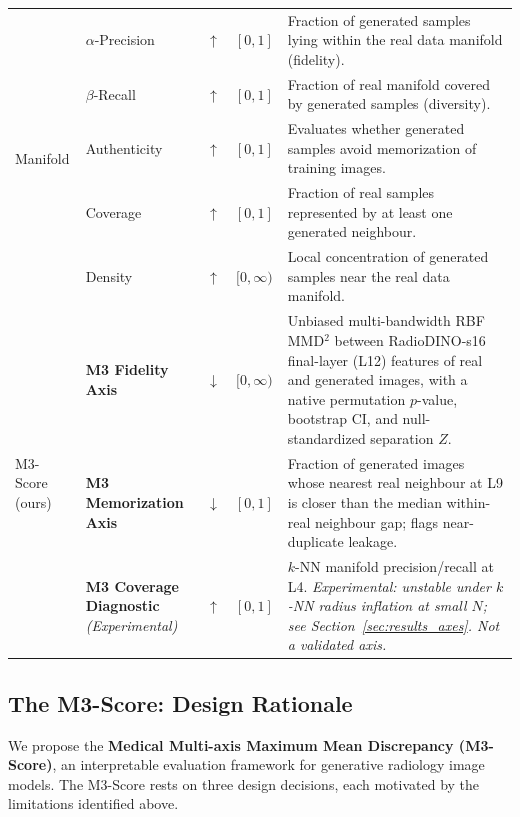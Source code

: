 \documentclass[lettersize,journal]{IEEEtran}
\begin{document}
\begin{table}[t]
\begin{tabularx}{\textwidth}{l l c c X}
\midrule

\multirow{5}{*}{Manifold}
  & $\alpha$-Precision~\cite{kynkaanniemi2019pr,alaa2022faithful}
  & $\uparrow$ & $[0,1]$
  & Fraction of generated samples lying within the real data
    manifold (fidelity). \\
  & $\beta$-Recall~\cite{kynkaanniemi2019pr,alaa2022faithful}
  & $\uparrow$ & $[0,1]$
  & Fraction of real manifold covered by generated samples
    (diversity). \\
  & Authenticity
  & $\uparrow$ & $[0,1]$
  & Evaluates whether generated samples avoid memorization
    of training images. \\
  & Coverage~\cite{naeem2020dc}
  & $\uparrow$ & $[0,1]$
  & Fraction of real samples represented by at least one
    generated neighbour. \\
  & Density~\cite{naeem2020dc}
  & $\uparrow$ & $[0,\infty)$
  & Local concentration of generated samples near the real
    data manifold. \\

\midrule

\multirow{3}{*}{M3-Score (ours)}
  & \textbf{M3 Fidelity Axis}
  & $\downarrow$ & $[0,\infty)$
  & Unbiased multi-bandwidth RBF MMD$^2$ between RadioDINO-s16 final-layer (L12) features of real and generated images, with a native permutation $p$-value, bootstrap CI, and null-standardized separation $Z$. \\
  & \textbf{M3 Memorization Axis}
  & $\downarrow$ & $[0,1]$
  & Fraction of generated images whose nearest real neighbour at L9 is closer than the median within-real neighbour gap; flags near-duplicate leakage. \\
  & \textbf{M3 Coverage Diagnostic}\,\emph{(Experimental)}
  & $\uparrow$ & $[0,1]$
  & $k$-NN manifold precision/recall at L4. \emph{Experimental: unstable under $k$-NN radius inflation at small $N$; see Section~\ref{sec:results_axes}. Not a validated axis.} \\
\bottomrule
\end{tabularx}
\end{table}

\subsection{The M3-Score: Design Rationale}
\label{sec:proposed}

We propose the \textbf{Medical Multi-axis Maximum Mean Discrepancy (M3-Score)}, an interpretable evaluation framework for generative radiology image models. The M3-Score rests on three design decisions, each motivated by the limitations identified above.
\end{document}
